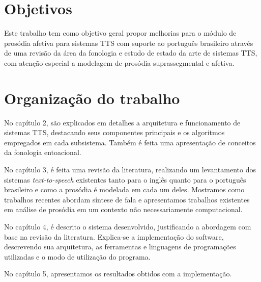 \section{Objetivos}
Este trabalho tem como objetivo geral propor melhorias para o módulo de prosódia
afetiva para sistemas TTS com suporte ao português brasileiro através de uma
revisão da área da fonologia e estudo de estado da arte de sistemas TTS, com
atenção especial a modelagem de prosódia suprassegmental e afetiva.

\section{Organização do trabalho}

No capítulo 2, são explicados em detalhes a arquitetura e funcionamento de sistemas
TTS, destacando seus componentes principais e os algoritmos empregados em cada
subsistema. Também é feita uma apresentação de conceitos da fonologia entoacional.


No capítulo 3, é feita uma revisão da literatura, realizando um levantamento dos
sistemas \emph{text-to-speech} existentes tanto para o inglês quanto para o
português brasileiro e como a prosódia é modelada em cada um deles. Mostramos
como trabalhos recentes abordam síntese de fala e apresentamos trabalhos
existentes em análise de prosódia em um contexto não necessariamente
computacional.

No capítulo 4, é descrito o sistema desenvolvido, justificando a abordagem com
base na revisão da literatura. Explica-se a implementação do software,
descrevendo sua arquitetura, as ferramentas e linguagens de programações
utilizadas e o modo de utilização do programa.

No capítulo 5, apresentamos os resultados obtidos com a implementação.